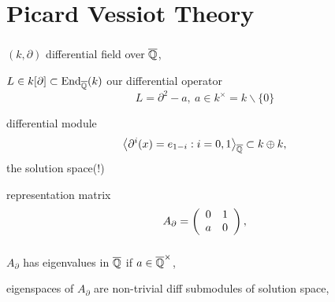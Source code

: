 \section{Picard Vessiot Theory}


\begin{frame}
\frametitle{}
\bi
\item $(k, \partial)$ differential field over $\qzcl$,
\item $L  \in k[\partial] \subset \mathrm{End}_{\qzcl}(k)$ our differential operator
$$L = \partial^2 - a,\ a \in k^\times = k\backslash \{0\}$$
\item differential module
$$\left<\partial^i(x) = e_{1-i} : i = 0, 1\right>_{\qzcl} \subset k \oplus k,$$
the solution space(!)
\item representation matrix
$$A_\partial = \left(\bao{cc}0&1\\a&0\\\ea\right),$$
\ei
\end{frame}

\begin{frame}
\frametitle{}
\bi
\item $A_\partial$ has eigenvalues in $\qzcl$ if $a \in \qzcl^\times$,
\item eigenspaces of $A_\partial$ are non-trivial diff submodules of solution space,
\ei
\end{frame}

